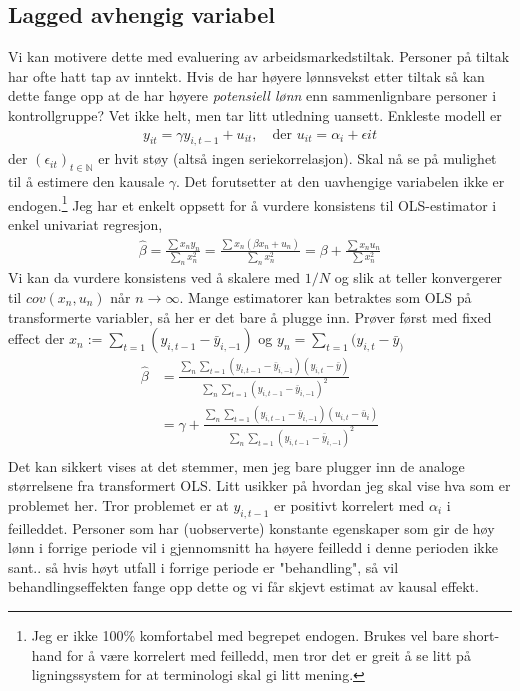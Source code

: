 \subsection{Lagged avhengig variabel}
Vi kan motivere dette med evaluering av arbeidsmarkedstiltak. Personer på tiltak har ofte hatt tap av inntekt. Hvis de har høyere lønnsvekst etter tiltak så kan dette fange opp at de har høyere \textit{potensiell lønn} enn sammenlignbare personer i kontrollgruppe? Vet ikke helt, men tar litt utledning uansett. Enkleste modell er
\begin{align}
y_{it} = \gamma y_{i,t-1}+u_{it}, \quad \text{der } u_{it}=\alpha_i+\epsilon{it}
\end{align}
der $(\epsilon_{it})_{t\in \mathbb{N}}$ er hvit støy (altså ingen seriekorrelasjon). Skal nå se på mulighet til å estimere den kausale $\gamma$. Det forutsetter at den uavhengige variabelen ikke er endogen.\footnote{Jeg er ikke 100\% komfortabel med begrepet endogen. Brukes vel bare short-hand for å være korrelert med feilledd, men tror det er greit å se litt på ligningssystem for at terminologi skal gi litt mening.} Jeg har et enkelt oppsett for å vurdere konsistens til OLS-estimator i enkel univariat regresjon,
\begin{align}
\hat{\beta}= \frac{\sum x_n y_n}{\sum_n x_n^2} = \frac{\sum x_n (\beta x_n +u_n)}{\sum_n x_n^2} = \beta + \frac{\sum x_n u_n}{\sum x_n^2}
\end{align}
Vi kan da vurdere konsistens ved å skalere med $1/N$ og slik at teller konvergerer til $cov(x_n,u_n)$ når $n\to \infty$. Mange estimatorer kan betraktes som OLS på transformerte variabler, så her er det bare å plugge inn. Prøver først med fixed effect der $x_n := \sum_{t=1}( y_{i,t-1}-\bar{y}_{i,-1})$ og $y_n = \sum_{t=1}( y_{i,t}-\bar{y}_)$
\begin{align}
\hat{\beta}&= \frac{\sum_n \sum_{t=1}( y_{i,t-1}-\bar{y}_{i,-1})( y_{i,t}-\bar{y})}{\sum_n \sum_{t=1}( y_{i,t-1}-\bar{y}_{i,-1})^2}\\
& = \gamma+ \frac{\sum_n \sum_{t=1}( y_{i,t-1}-\bar{y}_{i,-1})(u_{i,t}-\bar{u}_i)}{\sum_n \sum_{t=1}( y_{i,t-1}-\bar{y}_{i,-1})^2}\\
\end{align} 
Det kan sikkert vises at det stemmer, men jeg bare plugger inn de analoge størrelsene fra transformert OLS. Litt usikker på hvordan jeg skal vise hva som er problemet her. Tror problemet er at $y_{i,t-1}$ er  positivt korrelert med $\alpha_i$ i feilleddet. Personer som har (uobserverte) konstante egenskaper som gir de høy lønn i forrige periode vil i gjennomsnitt ha høyere feilledd i denne perioden ikke sant.. så hvis høyt utfall i forrige periode er "behandling", så vil behandlingseffekten fange opp dette og vi får skjevt estimat av kausal effekt.

